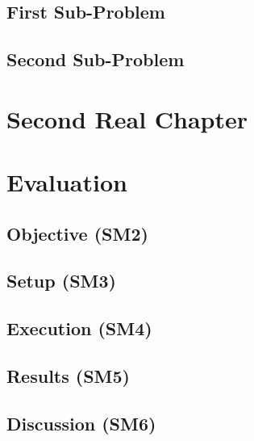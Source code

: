 \documentclass[
	a4paper,
	pagesize,
	pdftex,
	12pt,
	ngerman,
	fleqn,
	final,
	]{scrartcl}
\theoremstyle{plain}
\theoremstyle{definition}
\begin{document}
	\subsection{First Sub-Problem}
	
	\subsection{Second Sub-Problem}

\section{Second Real Chapter}

\section{Evaluation}

	\subsection{Objective (SM2)}
	
	\subsection{Setup (SM3)}
	
	\subsection{Execution (SM4)}
	
	\subsection{Results (SM5)}
	
	\subsection{Discussion (SM6)}

\end{document}
